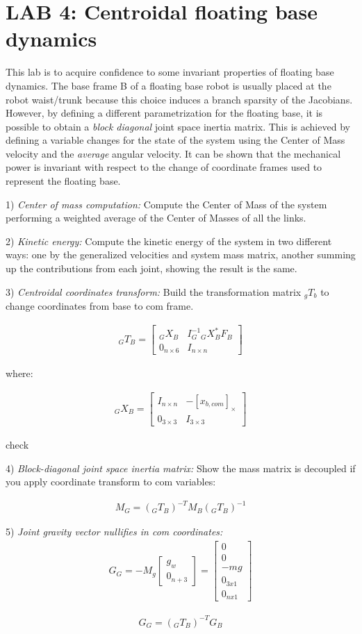 \documentclass{report}
\newcommand{\mat}[1]{\ensuremath{\begin{bmatrix}#1\end{bmatrix}}}	%
\begin{document}
\section*{LAB 4: Centroidal floating base  dynamics}

This lab is to acquire confidence to some invariant properties of floating base dynamics. 
The base frame B of a floating base robot is usually placed at the robot waist/trunk because this choice induces a  branch sparsity of the Jacobians. 
However, by defining a different parametrization for the floating base, it is possible to obtain a \textit{block diagonal} joint space inertia matrix.  This is achieved by defining a variable changes for the state of the system using the Center of Mass velocity and the \textit{average} angular velocity.  It can be shown that the mechanical power is invariant with respect to the change of coordinate frames used to represent the floating base. 

1) \textit{Center of mass computation:}
Compute the Center of Mass of the system performing a weighted average of the Center of Masses of all the links. 

2) \textit{Kinetic energy:}
Compute the kinetic energy of the system in two different ways: one by the generalized velocities and system mass matrix, another summing up the contributions from each joint, showing the result is the same. 

3) \textit{Centroidal coordinates transform:} 
Build the transformation matrix ${}_gT_b$ to change coordinates from base to com frame.


\begin{align}
{}_GT_B  = \mat{    {}_GX_B  & I_G^{-1} {}_GX_B^{*} F_B  \\ 0_{n \times 6} &   I_{n \times n} }
\end{align}

where: 

\begin{align}
 {}_GX_B = \mat{ I_{n \times n}  & -[x_{b, com}]_{\times} \\ 0_{3 \times 3} & 	 I_{3 \times 3}}
 	\label{fig:}
\end{align}

check 

4) \textit{Block-diagonal joint space inertia matrix:}
Show the mass matrix is decoupled if you apply coordinate transform to com variables:

\begin{align}
M_G = ({}_GT_B)^{-T} M_B ({}_GT_B)^{-1}
\label{fig:}
\end{align}

5) \textit{Joint gravity vector nullifies in com coordinates:}
\begin{align}
G_G = -M_g \mat{g_w \\ 0_{n+3}} = \mat{0 \\0\\ -mg  \\ 0_{3x1} \\0_{nx1} }
\label{fig:}
\end{align}

\begin{align}
G_G =  ({}_GT_B)^{-T} G_B
\label{fig:}
\end{align}
\end{document}
